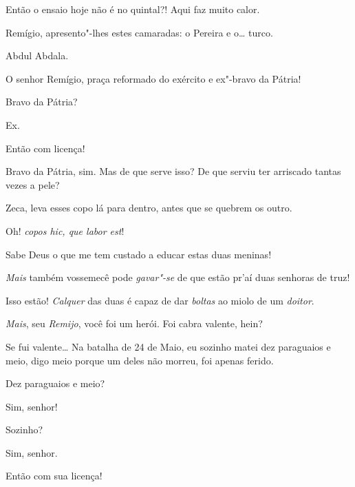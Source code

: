  Então o ensaio hoje não é no quintal?! Aqui faz muito calor.

 Remígio, apresento"-lhes estes camaradas: o Pereira e o\ldots{} 
turco.

 Abdul Abdala. 

 O senhor Remígio, praça reformado do exército e ex"-bravo
da Pátria!

   Bravo da Pátria?

 Ex.

 Então com licença! 

Bravo da Pátria, sim. Mas de que serve isso? De que serviu ter arriscado tantas
vezes a pele? 

 Zeca, leva esses copo lá para dentro, antes que
se quebrem os outro.

 Oh!  \textit{copos hic, que labor est}!

Sabe Deus o que me tem custado a educar
estas duas meninas!

 \textit{Mais} também vossemecê pode \textit{gavar"-se} de que estão
pr'aí duas senhoras de truz!

 Isso estão! \textit{Calquer} das duas é capaz de dar
\textit{boltas} ao miolo de um \textit{doitor}.

 \textit{Mais}, seu \textit{Remijo}, você foi um herói. Foi cabra
valente, hein?

 Se fui valente\ldots{} Na batalha de 24 de Maio, eu
sozinho matei dez paraguaios e meio, digo meio porque um deles não morreu, foi
apenas ferido.

 Dez paraguaios e meio?

 Sim, senhor!

 Sozinho?

 Sim, senhor.

 Então com sua licença! 

